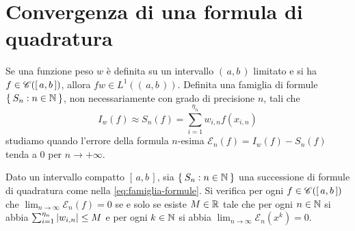 \section[Convergenza delle formule]{Convergenza di una formula di quadratura}
	
	\noindent Se una funzione peso \(w\) è definita su un intervallo \((\, a, b \,)\) limitato e si ha \(f \in \mathscr{C}([\, a, b \,])\), allora \(f w \in L^1 ((\, a, b \,))\). Definita una famiglia di formule \(\Set{S_n : n \in \mathbb{N}}\), non necessariamente con grado di precisione \(n\), tali che
	\begin{equation}\label{eq:famiglia-formule}
		I_w (f) \approx S_n (f) = \sum_{i = 1}^{\eta_n} w_{i, n} f (x_{i, n})
	\end{equation}
	studiamo quando l'errore della formula \(n\)-esima \(\mathcal{E}_n (f) = I_w (f) - S_n (f)\) tenda a \(0\) per \(n \to + \infty\).
	
	\begin{teorema}\label{th:polya-steklov}
		Dato un intervallo compatto \([\, a, b \,]\), sia \(\Set{S_n : n \in \mathbb{N}}\) una successione di formule di quadratura come nella \eqref{eq:famiglia-formule}. Si verifica per ogni \(f \in \mathscr{C} ([\, a, b \,])\) che \(\lim_{n \to \infty} \mathcal{E}_n (f) = 0\) se e solo se esiste \(M \in \mathbb{R}\) tale che per ogni \(n \in \mathbb{N}\) si abbia \(\sum_{i = 1}^{\eta_n} \abs{w_{i, n}} \le M\) e per ogni \(k \in \mathbb{N}\) si abbia \(\lim_{n \to \infty} \mathcal{E}_n (x^k) = 0\). 
	\end{teorema}

